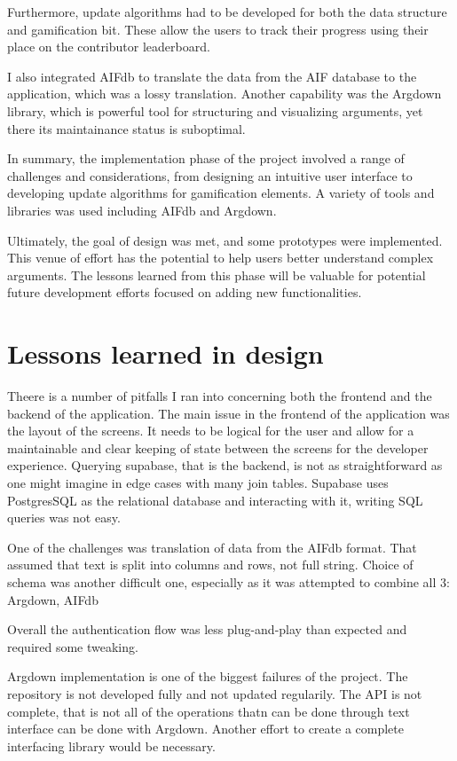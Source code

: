 \documentclass{report}
\begin{document}
Furthermore, update algorithms had to be developed for both the data structure and gamification bit. These allow the users to track their progress using their place on the contributor leaderboard. 

I also integrated AIFdb to translate the data from the AIF database to the application, which was a lossy translation.
Another capability was the Argdown library, which is powerful tool for structuring and visualizing arguments, yet there its maintainance status is suboptimal.

In summary, the implementation phase of the project involved a range of challenges and considerations, from designing an intuitive user interface to developing update algorithms for gamification elements. A variety of tools and libraries was used including AIFdb and Argdown. 

Ultimately, the goal of design was met, and some prototypes were implemented. This venue of effort has the potential to help users better understand complex arguments. The lessons learned from this phase will be valuable for potential future development efforts focused on adding new functionalities.


\section{Lessons learned in design}
Theere is a number of pitfalls I ran into concerning both the frontend and the backend of the application. The main issue in the frontend of the application was the layout of the screens. It needs to be logical for the user and allow for a maintainable and clear keeping of state between the screens for the developer experience. Querying supabase, that is the backend, is not as straightforward as one might imagine in edge cases with many join tables. Supabase uses PostgresSQL as the relational database and interacting with it, writing SQL queries was not easy. 

One of the challenges was translation of data from the AIFdb format. That assumed that text is split into columns and rows, not full string.
Choice of schema was another difficult one, especially as it was attempted to combine all 3: Argdown, AIFdb
\cite{abbott_internet_2016}

Overall the authentication flow was less plug-and-play than expected and required some tweaking. 

Argdown implementation is one of the biggest failures of the project. The repository is not developed fully and not updated regularily. The API is not complete, that is not all of the operations thatn can be done through text interface can be done with Argdown. Another effort to create a complete interfacing library would be necessary.
\end{document}
